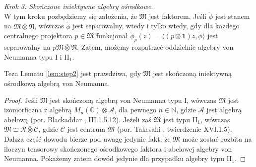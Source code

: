 {\it Krok 3: Skończone iniektywne algebry ośrodkowe}.\\
W tym kroku pozbędziemy się założenia, że $\mathfrak{M}$ jest faktorem.
Jeśli $\tilde{\phi}$ jest stanem na $\mathfrak{M} \bar{\otimes} \mathfrak{N}$,
wówczas $\tilde{\phi}$ jest separowalny,
wtedy i tylko wtedy, gdy
dla każdego centralnego projektora $p \in \mathfrak{M}$
funkcjonał
$\tilde{\phi}_{p} (z) = \langle (p \otimes \mathbf{1}) z, \tilde{\phi}\rangle$
jest separowalny na $p\mathfrak{M} \bar{\otimes} \mathfrak{N}$.
Zatem, możemy rozpatrzeć oddzielnie algebry von Neumanna
typu I i II$\phantom{}_{1}$.
\begin{Lemma}
\label{lem:step3}
Teza Lematu \ref{lem:step2} jest prawdziwa, gdy $\mathfrak{M}$
jest skończoną iniektywną ośrodkową algebrą von Neumanna.
\end{Lemma}
\begin{proof}
Jeśli $\mathfrak{M}$ jest skończoną algebrą von Neumanna typu I,
wówczas $\mathfrak{M}$ jest izomorficzna z algebrą
$M_{n}(\mathbb{C}) \bar{\otimes} \mathcal{A}$, dla pewnego $n \in \mathbb{N}$,
gdzie $\mathcal{A}$ jest algebrą abelową
(por. Blackaddar \cite{Blackadar2006}, III.1.5.12).
Jeżeli zaś $\mathfrak{M}$ jest typu II$\phantom{}_{1}$,
wówczas $\mathfrak{M} \cong  \mathcal{R}\bar{\otimes}\mathcal{C}$,
gdzie $\mathcal{C}$ jest centrum $\mathfrak{M}$
(por. Takesaki \cite{Takesaki3}, twierdzenie XVI.1.5).
Dalsza część dowodu bierze pod uwagę jedynie fakt, że $\mathfrak{M}$
może zostać rozbita na iloczyn tensorowy skończonego ośrodkowego faktora i
abelowej algebry von Neumanna.
Pokażemy zatem dowód jedynie dla przypadku algebry typu II$\phantom{}_{1}$.


\end{proof}
